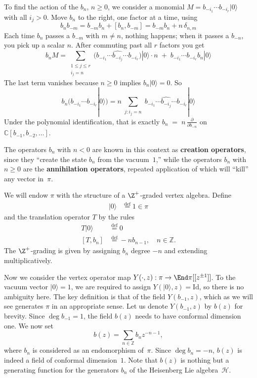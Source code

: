 \documentclass[12pt]{article}
\begin{document}
To find the action of the $b_n$, $n\ge 0$, we consider a monomial $M=b_{-i_1}\cdots b_{-i_r}|0\rangle$ with all $i_j>0$. Move $b_n$ to the right, one factor at a time, using
\[b_n b_{-m}=b_{-m} b_n + [b_n,b_{-m}]
    = b_{-m} b_n + n\,\delta_{n,m}\]
Each time $b_n$ passes a $b_{-m}$ with $m\neq n$, nothing happens; when it passes a $b_{-n}$, you pick up a scalar $n$. After commuting past all $r$ factors you get
\[b_n M
    = \sum_{\substack{1\le j\le r\\ i_j=n}}
    \big(b_{-i_1}\cdots \widehat{b_{-i_j}}\cdots b_{-i_r}\big)|0\rangle
    \cdot n \;+\; b_{-i_1}\cdots b_{-i_r} b_n|0\rangle\]
The last term vanishes because $n\ge0$ implies $b_n|0\rangle=0$. So
\[b_n\big(b_{-i_1}\cdots b_{-i_r}|0\rangle\big)
    = n\sum_{\substack{j: i_j=n}}
    b_{-i_1}\cdots \widehat{b_{-i_j}}\cdots b_{-i_r}|0\rangle\]
Under the polynomial identification, that is exactly
$b_n \;=\; n\,\frac{\partial}{\partial b_{-n}}$
on $\mathbb{C}[b_{-1},b_{-2},\dots]$.


The operators $b_n$ with $n<0$ are known in this context as \textbf{creation operators}, since they ``create the state $b_n$ from the vacuum~$1$,''
while the operators $b_n$ with $n\ge 0$ are the \textbf{annihilation operators}, repeated application of which will ``kill'' any vector in~$\pi$.

We will endow $\pi$ with the structure of a $\Z^+$-graded vertex algebra. Define \begin{align*}
    |0\rangle & \stackrel{\mathrm{def}}{=} 1 \in \pi
\end{align*} and the translation operator $T$ by the rules \begin{align*}
    T|0\rangle & \stackrel{\mathrm{def}}{=} 0                                 \\
    [T,b_n]    & \stackrel{\mathrm{def}}{=} -n b_{n-1}, \quad n\in\mathbb{Z}.
\end{align*} The $\Z^+$-grading is given by assigning $b_n$ degree $-n$ and extending multiplicatively.

Now we consider the vertex operator map $Y(\cdot,z): \pi \to \End \pi[[z^{\pm1}]]$. To the vacuum vector $\lvert 0 \rangle = 1$, we are required to assign $Y(\lvert 0 \rangle, z) = \mathrm{Id}$, so there is no ambiguity here. The key definition is that of the field $Y(b_{-1}, z)$, which as we will see generates $\pi$ in an appropriate sense.
Let us denote $Y(b_{-1}, z)$ by $b(z)$ for brevity.
Since $\deg b_{-1} = 1$, the field $b(z)$ needs to have conformal dimension one.
We now set
\[
    b(z) = \sum_{n\in\mathbb{Z}} b_n z^{-n-1},
\]
where $b_n$ is considered as an endomorphism of~$\pi$.
Since $\deg b_n = -n$, $b(z)$ is indeed a field of conformal dimension~$1$.
Note that $b(z)$ is nothing but a generating function for the generators $b_n$ of the Heisenberg Lie algebra~$\mathcal{H}$.
\end{document}
